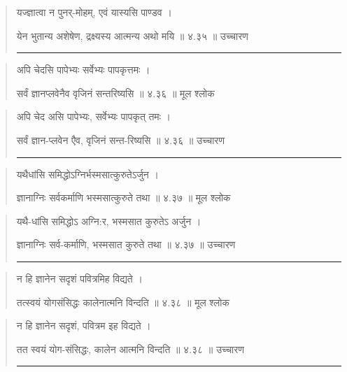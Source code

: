 \begin{quotation}

यज्ज्ञात्वा न पुनर्-मोहम्, एवं यास्यसि पाण्डव  ।  

येन भुतान्य अशेषेण, द्रक्ष्यस्य आत्मन्य अथो मयि  ॥ ४.३५ ॥  उच्चारण

\noindent\rule{16cm}{0.4pt} 
\end{quotation}


\begin{quotation}

अपि चेदसि पापेभ्यः सर्वेभ्यः पापकृत्तमः  ।  

सर्वं ज्ञानप्लवेनैव वृजिनं सन्तरिष्यसि  ॥ ४.३६ ॥  मूल श्लोक
\end{quotation}

\begin{quotation}

अपि चेद असि पापेभ्यः, सर्वेभ्यः पापकृत् तमः  ।  

सर्वं ज्ञान-प्लवेन एैव, वृजिनं सन्त-रिष्यसि  ॥ ४.३६ ॥  उच्चारण

\noindent\rule{16cm}{0.4pt} 
\end{quotation}


\begin{quotation}

यथैधांसि समिद्धोऽग्निर्भस्मसात्कुरुतेऽर्जुन  ।  

ज्ञानाग्निः सर्वकर्माणि भस्मसात्कुरुते तथा  ॥ ४.३७ ॥  मूल श्लोक
\end{quotation}

\begin{quotation}

यथै-धांसि समिद्धोऽ अग्नि:र, भस्मसात कुरुतेऽ अर्जुन  ।  

ज्ञानाग्निः सर्व-कर्माणि, भस्मसात कुरुते तथा  ॥ ४.३७ ॥  उच्चारण

\noindent\rule{16cm}{0.4pt} 
\end{quotation}


\begin{quotation}

न हि ज्ञानेन सदृशं पवित्रमिह विद्यते  ।  

तत्स्वयं योगसंसिद्धः कालेनात्मनि विन्दति  ॥ ४.३८ ॥  मूल श्लोक
\end{quotation}

\begin{quotation}

न हि ज्ञानेन सदृशं, पवित्रम इह विद्यते  ।  

तत स्वयं योग-संसिद्धः, कालेन आत्मनि विन्दति  ॥ ४.३८ ॥  उच्चारण

\noindent\rule{16cm}{0.4pt} 
\end{quotation}


